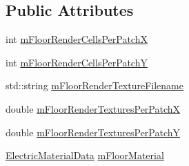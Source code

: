 \subsection*{Public Attributes}
\begin{DoxyCompactItemize}
\item 
int \hyperlink{class_floor_render_data_af2f9d563314481158845495692fe31e7}{m\-Floor\-Render\-Cells\-Per\-Patch\-X}
\item 
int \hyperlink{class_floor_render_data_a1a563fff5b57ea69ba9bb192873c09db}{m\-Floor\-Render\-Cells\-Per\-Patch\-Y}
\item 
std\-::string \hyperlink{class_floor_render_data_ac1540b554998d32dabc4d69af1e92f0d}{m\-Floor\-Render\-Texture\-Filename}
\item 
double \hyperlink{class_floor_render_data_a7135effa977d515b9d3b648531b0b730}{m\-Floor\-Render\-Textures\-Per\-Patch\-X}
\item 
double \hyperlink{class_floor_render_data_afc74644c8e0c98fadcb158a5e3cd7e10}{m\-Floor\-Render\-Textures\-Per\-Patch\-Y}
\item 
\hyperlink{class_electric_material_data}{Electric\-Material\-Data} \hyperlink{class_floor_render_data_a58cca19207e9f58aabde32f83267e918}{m\-Floor\-Material}
\end{DoxyCompactItemize}


